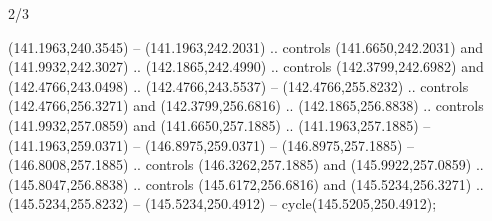 \begin{flagdescription}{2/3}
\begin{scope}[xshift=0.5\flaglength,yshift=0.5\flagwidth,scale=\flagwidth/235.81]
\begin{scope}[y=0.8pt, x=0.8pt, yscale=-1,shift={(-239.08,-147.38)}]
    (141.1963,240.3545) -- (141.1963,242.2031) .. controls (141.6650,242.2031) and
    (141.9932,242.3027) .. (142.1865,242.4990) .. controls (142.3799,242.6982) and
    (142.4766,243.0498) .. (142.4766,243.5537) -- (142.4766,255.8232) .. controls
    (142.4766,256.3271) and (142.3799,256.6816) .. (142.1865,256.8838) .. controls
    (141.9932,257.0859) and (141.6650,257.1885) .. (141.1963,257.1885) --
    (141.1963,259.0371) -- (146.8975,259.0371) -- (146.8975,257.1885) --
    (146.8008,257.1885) .. controls (146.3262,257.1885) and (145.9922,257.0859) ..
    (145.8047,256.8838) .. controls (145.6172,256.6816) and (145.5234,256.3271) ..
    (145.5234,255.8232) -- (145.5234,250.4912) -- cycle(145.5205,250.4912);
\end{scope}
\end{scope}
\framecode{}
\end{flagdescription}
